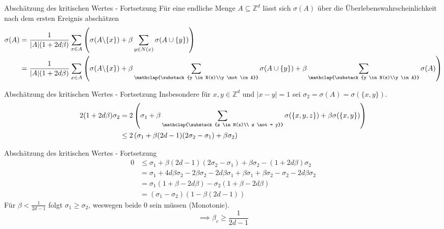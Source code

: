 \documentclass[11pt]{beamer}
\begin{document}
\begin{frame}{Absch\"atzung des kritischen Wertes - Fortsetzung}
    F\"ur eine endliche Menge $A \subseteq \mathbb{Z}^d$ l\"asst sich $\sigma(A)$ \"uber die \"Uberlebenswahrscheinlichkeit nach dem ersten
    Ereignis absch\"atzen
    \begin{align*}
        \sigma(A) &= \frac{1}{|A|(1 + 2d \beta)}\sum_{x \in A} \left( \sigma(A \backslash \{ x \})
                   + \beta \sum_{y \in N(x)} \sigma(A \cup \{ y \}) \right) \\
                  &= \frac{1}{|A|(1 + 2d \beta)} \sum_{x \in A} \left( \sigma(A \backslash \{ x \})
                   + \beta \sum_{\mathclap{\substack{y \in N(x)\\y \not\in A}}} \sigma(A \cup \{ y \}) 
                   + \beta \sum_{\mathclap{\substack{y \in N(x)\\y \in A}}}\sigma(A) \right)
    \end{align*}
\end{frame}
\begin{frame}{Absch\"atzung des kritischen Wertes - Fortsetzung}
    Insbesondere f\"ur $x, y \in \mathbb{Z}^d$ und $|x - y| = 1$ sei $\sigma_2 = \sigma(A) = \sigma(\{ x, y \})$.
    \begin{align*}
        2(1 + 2d\beta)\sigma_2 &= 2\left(\sigma_1
                               + \beta \sum_{\mathclap{\substack{z \in N(x)\\ z \not = y}}} \sigma(\{ x, y, z \})
                               + \beta \sigma(\{ x, y \}) \right) \\
                              &\leq 2\left( \sigma_1 + \beta (2d - 1) (2 \sigma_2 - \sigma_1)
                               + \beta \sigma_2 \right)
    \end{align*}
\end{frame}

\begin{frame}{Absch\"atzung des kritischen Wertes - Fortsetzung}
    \begin{align*}
        0 &\leq \sigma_1 + \beta (2d - 1) (2 \sigma_2 - \sigma_1) + \beta \sigma_2 -  (1 + 2d\beta)\sigma_2 \\
          &= \sigma_1 + 4d \beta \sigma_2 - 2 \beta \sigma_2 - 2d \beta \sigma_1 + \beta \sigma_1 + \beta \sigma_2
           - \sigma_2 - 2d \beta \sigma_2 \\
          &= \sigma_1 (1 + \beta - 2d\beta) - \sigma_2 (1 + \beta - 2d \beta) \\
          &= (\sigma_1 - \sigma_2)(1 - \beta(2d - 1))
    \end{align*}
    Für $\beta < \frac{1}{2d - 1}$ folgt $\sigma_1 \geq \sigma_2$, weswegen beide $0$ sein m\"ussen (Monotonie).
    \begin{equation*}
        \implies \beta_c \geq \frac{1}{2d - 1} 
    \end{equation*}
\end{frame}
\end{document}

